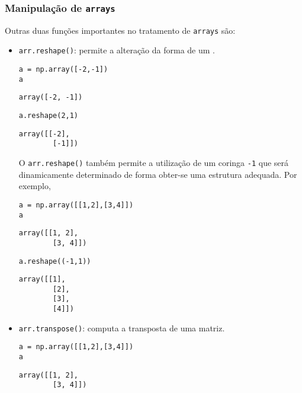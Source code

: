\documentclass[12pt]{article}
\begin{document}
\subsubsection{Manipulação de \texttt{arrays}}

Outras duas funções importantes no tratamento de \lstinline+arrays+ são:
\begin{itemize}
\item \lstinline+arr.reshape()+: permite a alteração da forma de um {\PYTHONnumpyDOTarray}.
  
\begin{lstlisting}
a = np.array([-2,-1])
a
\end{lstlisting}

\begin{verbatim}
array([-2, -1])
\end{verbatim}

\begin{lstlisting}
a.reshape(2,1)
\end{lstlisting}

\begin{verbatim}
array([[-2],
        [-1]])
\end{verbatim}

O \lstinline+arr.reshape()+ também permite a utilização de um coringa \lstinline+-1+ que será dinamicamente determinado de forma obter-se uma estrutura adequada. Por exemplo,

\begin{lstlisting}
a = np.array([[1,2],[3,4]])
a
\end{lstlisting}

\begin{verbatim}
array([[1, 2],
        [3, 4]])
\end{verbatim}

\begin{lstlisting}
a.reshape((-1,1))
\end{lstlisting}

\begin{verbatim}
array([[1],
        [2],
        [3],
        [4]])
\end{verbatim}

\item \lstinline+arr.transpose()+: computa a transposta de uma matriz.

\begin{lstlisting}
a = np.array([[1,2],[3,4]])
a
\end{lstlisting}

\begin{verbatim}
array([[1, 2],
        [3, 4]])
\end{verbatim}


\end{itemize}
\end{document}
